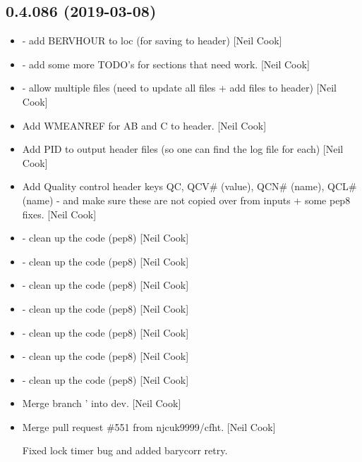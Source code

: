 \documentclass[a4paper,10pt,english]{report}
\begin{document}
\subsection{0.4.086 (2019-03-08)}
\label{\detokenize{misc/changelog:id175}}\begin{itemize}
\item {} 
 - add BERVHOUR to loc (for saving to header) {[}Neil Cook{]}

\item {} 
 - add some more TODO’s for sections that
need work. {[}Neil Cook{]}

\item {} 
 - allow multiple files (need to update all files + add files to
header) {[}Neil Cook{]}

\item {} 
Add WMEANREF for AB and C to header. {[}Neil Cook{]}

\item {} 
Add PID to output header files (so one can find the log file for each)
{[}Neil Cook{]}

\item {} 
Add Quality control header keys QC, QCV\# (value), QCN\# (name), QCL\#
(name) - and make sure these are not copied over from inputs + some
pep8 fixes. {[}Neil Cook{]}

\item {} 
 - clean up the code (pep8) {[}Neil Cook{]}

\item {} 
 - clean up the code (pep8) {[}Neil Cook{]}

\item {} 
 - clean up the code (pep8) {[}Neil Cook{]}

\item {} 
 - clean up the code (pep8) {[}Neil Cook{]}

\item {} 
 - clean up the code (pep8) {[}Neil Cook{]}

\item {} 
 - clean up the code (pep8) {[}Neil Cook{]}

\item {} 
 - clean up the code (pep8) {[}Neil Cook{]}

\item {} 
Merge branch ’ into dev. {[}Neil Cook{]}

\item {} 
Merge pull request \#551 from njcuk9999/cfht. {[}Neil Cook{]}

Fixed lock timer bug and added barycorr retry.

\end{itemize}
\end{document}
